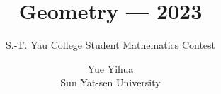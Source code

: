 \documentclass[
    fontsize=11pt, %
    twoside=false, %
    secnumdepth=2, %
    parskip=full-, %
    fontmethod=tex, %
]{kaobook}
\begin{document}

\title{Geometry — 2023}
\subtitle{S.-T. Yau College Student Mathematics Contest}
\author{Yue Yihua\\Sun Yat-sen University}
\date{\the\year}


\frontmatter %

\thispagestyle{empty}
\end{document}
